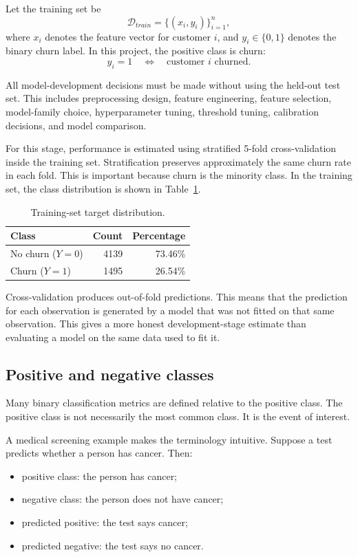 Let the training set be
\[
\mathcal{D}_{train}
=
\{(x_i,y_i)\}_{i=1}^{n},
\]
where \(x_i\) denotes the feature vector for customer \(i\), and \(y_i \in \{0,1\}\) denotes the binary churn label. In this project, the positive class is churn:
\[
y_i = 1 \quad \Longleftrightarrow \quad \text{customer } i \text{ churned}.
\]

All model-development decisions must be made without using the held-out test set. This includes preprocessing design, feature engineering, feature selection, model-family choice, hyperparameter tuning, threshold tuning, calibration decisions, and model comparison.

For this stage, performance is estimated using stratified 5-fold cross-validation inside the training set. Stratification preserves approximately the same churn rate in each fold. This is important because churn is the minority class. In the training set, the class distribution is shown in Table~\ref{tab:stage04-target-distribution}.

\begin{table}[H]
\centering
\caption{Training-set target distribution.}
\label{tab:stage04-target-distribution}
\begin{tabular}{lrr}
\toprule
Class & Count & Percentage \\
\midrule
No churn (\(Y=0\)) & 4139 & 73.46\% \\
Churn (\(Y=1\)) & 1495 & 26.54\% \\
\bottomrule
\end{tabular}
\end{table}

Cross-validation produces out-of-fold predictions. This means that the prediction for each observation is generated by a model that was not fitted on that same observation. This gives a more honest development-stage estimate than evaluating a model on the same data used to fit it.

\subsection{Positive and negative classes}

Many binary classification metrics are defined relative to the positive class. The positive class is not necessarily the most common class. It is the event of interest.

A medical screening example makes the terminology intuitive. Suppose a test predicts whether a person has cancer. Then:
\begin{itemize}
    \item positive class: the person has cancer;
    \item negative class: the person does not have cancer;
    \item predicted positive: the test says cancer;
    \item predicted negative: the test says no cancer.
\end{itemize}

